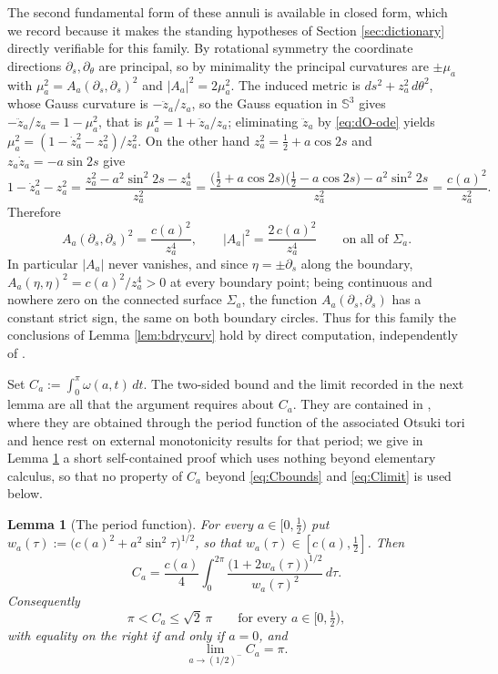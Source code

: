 \documentclass[11pt,a4paper]{amsart}
\theoremstyle{plain}
\newtheorem{lemma}[theorem]{Lemma}
\theoremstyle{definition}
\newcommand{\Sph}{\mathbb{S}}
\begin{document}
The second fundamental form of these annuli is available in closed form, which we record because it makes the standing hypotheses of Section \ref{sec:dictionary} directly verifiable for this family. By rotational symmetry the coordinate directions $\partial_s,\partial_\theta$ are principal, so by minimality the principal curvatures are $\pm\mu_a$ with $\mu_a^2=A_a(\partial_s,\partial_s)^2$ and $|A_a|^2=2\mu_a^2$. The induced metric is $ds^2+z_a^2\,d\theta^2$, whose Gauss curvature is $-\ddot z_a/z_a$, so the Gauss equation in $\Sph^3$ gives $-\ddot z_a/z_a=1-\mu_a^2$, that is $\mu_a^2=1+\ddot z_a/z_a$; eliminating $\ddot z_a$ by \eqref{eq:dO-ode} yields $\mu_a^2=(1-\dot z_a^2-z_a^2)/z_a^2$. On the other hand $z_a^2=\tfrac12+a\cos 2s$ and $z_a\dot z_a=-a\sin 2s$ give
\[
1-\dot z_a^2-z_a^2=\frac{z_a^2-a^2\sin^2 2s-z_a^4}{z_a^2}
=\frac{\bigl(\tfrac12+a\cos 2s\bigr)\bigl(\tfrac12-a\cos 2s\bigr)-a^2\sin^2 2s}{z_a^2}=\frac{c(a)^2}{z_a^2} .
\]
Therefore
\begin{equation}\label{eq:Aclosed}
A_a(\partial_s,\partial_s)^2=\frac{c(a)^2}{z_a^4},\qquad |A_a|^2=\frac{2\,c(a)^2}{z_a^4}\qquad\text{on all of }\Sigma_a .
\end{equation}
In particular $|A_a|$ never vanishes, and since $\eta=\pm\partial_s$ along the boundary, $A_a(\eta,\eta)^2=c(a)^2/z_a^{4}>0$ at every boundary point; being continuous and nowhere zero on the connected surface $\Sigma_a$, the function $A_a(\partial_s,\partial_s)$ has a constant strict sign, the same on both boundary circles. Thus for this family the conclusions of Lemma \ref{lem:bdrycurv} hold by direct computation, independently of \cite{NZ1}.

Set $C_a:=\int_0^{\pi}\omega(a,t)\,dt$. The two-sided bound and the limit recorded in the next lemma are all that the argument requires about $C_a$. They are contained in \cite[Lem. 2.5]{dO24}, where they are obtained through the period function of the associated Otsuki tori and hence rest on external monotonicity results for that period; we give in Lemma \ref{lem:period} a short self-contained proof which uses nothing beyond elementary calculus, so that no property of $C_a$ beyond \eqref{eq:Cbounds} and \eqref{eq:Climit} is used below.

\begin{lemma}[The period function]\label{lem:period}
For every $a\in[0,\tfrac12)$ put $w_a(\tau):=\bigl(c(a)^2+a^2\sin^2\tau\bigr)^{1/2}$, so that $w_a(\tau)\in[c(a),\tfrac12]$. Then
\begin{equation}\label{eq:Cclosed}
C_a=\frac{c(a)}{4}\int_0^{2\pi}\frac{\bigl(1+2w_a(\tau)\bigr)^{1/2}}{w_a(\tau)^2}\,d\tau .
\end{equation}
Consequently
\begin{equation}\label{eq:Cbounds}
\pi<C_a\leq\sqrt2\,\pi\qquad\text{for every }a\in\bigl[0,\tfrac12\bigr),
\end{equation}
with equality on the right if and only if $a=0$, and
\begin{equation}\label{eq:Climit}
\lim_{a\to(1/2)^-}C_a=\pi .
\end{equation}
\end{lemma}
\end{document}
